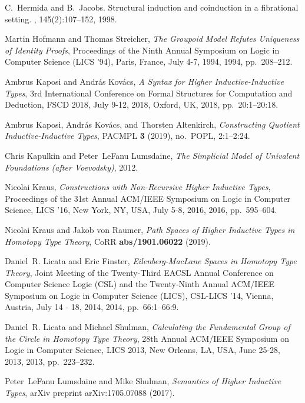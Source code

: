 \documentclass[9pt]{entcs}
\newcommand{\0}{\textbf{0}} %
\begin{document}
\begin{thebibliography}{10}
	C.~Hermida and B.~Jacobs.
	\newblock Structural induction and coinduction in a fibrational setting.
	, 145(2):107--152, 1998.
	
	Martin Hofmann and Thomas Streicher, \emph{{The Groupoid Model Refutes
			Uniqueness of Identity Proofs}}, Proceedings of the Ninth Annual Symposium on
	Logic in Computer Science {(LICS} '94), Paris, France, July 4-7, 1994, 1994,
	pp.~208--212.
	
	Ambrus Kaposi and Andr{\'{a}}s Kov{\'{a}}cs, \emph{{A Syntax for Higher
			Inductive-Inductive Types}}, 3rd International Conference on Formal
	Structures for Computation and Deduction, {FSCD} 2018, July 9-12, 2018,
	Oxford, {UK}, 2018, pp.~20:1--20:18.
	
	Ambrus Kaposi, Andr{\'{a}}s Kov{\'{a}}cs, and Thorsten Altenkirch,
	\emph{{Constructing Quotient Inductive-Inductive Types}}, {PACMPL} \textbf{3}
	(2019), no.~{POPL}, 2:1--2:24.
	
	Chris Kapulkin and Peter~LeFanu Lumsdaine, \emph{{The Simplicial Model of
			Univalent Foundations (after Voevodsky)}}, 2012.
	
	Nicolai Kraus, \emph{{Constructions with Non-Recursive Higher Inductive
			Types}}, Proceedings of the 31st Annual {ACM/IEEE} Symposium on Logic in
	Computer Science, {LICS} '16, New York, NY, USA, July 5-8, 2016, 2016,
	pp.~595--604.
	
	Nicolai Kraus and Jakob von Raumer, \emph{{Path Spaces of Higher Inductive
			Types in Homotopy Type Theory}}, CoRR \textbf{abs/1901.06022} (2019).
	
	Daniel~R. Licata and Eric Finster, \emph{{Eilenberg-MacLane Spaces in Homotopy
			Type Theory}}, Joint Meeting of the Twenty-Third {EACSL} Annual Conference on
	Computer Science Logic {(CSL)} and the Twenty-Ninth Annual {ACM/IEEE}
	Symposium on Logic in Computer Science (LICS), {CSL-LICS} '14, Vienna,
	Austria, July 14 - 18, 2014, 2014, pp.~66:1--66:9.
	
	Daniel~R. Licata and Michael Shulman, \emph{{Calculating the Fundamental Group
			of the Circle in Homotopy Type Theory}}, 28th Annual {ACM/IEEE} Symposium on
	Logic in Computer Science, {LICS} 2013, New Orleans, LA, USA, June 25-28,
	2013, 2013, pp.~223--232.
	
	Peter~LeFanu Lumsdaine and Mike Shulman, \emph{{Semantics of Higher Inductive
			Types}}, arXiv preprint arXiv:1705.07088 (2017).
	

\end{thebibliography}
\end{document}
